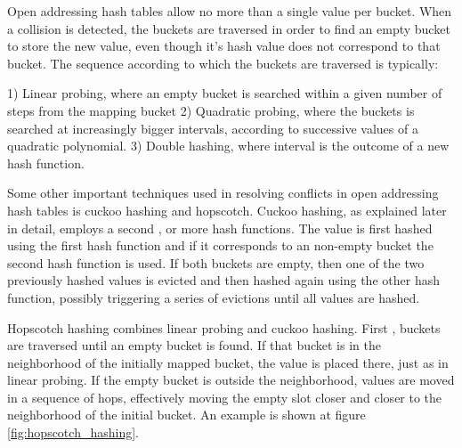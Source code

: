 Open addressing hash tables allow no more than a single value per bucket. When a collision is detected, the buckets are traversed in order to find an empty bucket to store the new value, even though it’s hash value does not correspond to that bucket. The sequence according to which the buckets are traversed is typically:

1) Linear probing, where an empty bucket is searched within a given number of steps from the mapping bucket
2) Quadratic probing, where the buckets is searched at increasingly bigger intervals, according to successive values of a quadratic polynomial. 
3) Double hashing, where interval is the outcome of a new hash function.


 Some other important techniques used in resolving conflicts in open addressing hash tables is cuckoo hashing and hopscotch. Cuckoo hashing, as explained later in detail, employs a second , or more hash functions. The value is first hashed using the first hash function  and if it corresponds to an non-empty bucket the second hash function is used. If both buckets are empty, then one of the two previously hashed values is evicted and then hashed again using the other hash function, possibly triggering a series of evictions until all values are hashed.


Hopscotch hashing combines linear probing and cuckoo hashing. First , buckets are traversed until an empty bucket is found. If that bucket is in the neighborhood of the initially mapped bucket, the value is placed there, just as in linear probing. If the empty bucket is outside the neighborhood, values are moved in a sequence of hops, effectively moving the empty slot closer and closer to the neighborhood of the initial bucket. An example is shown at figure \ref{fig:hopscotch_hashing}.

